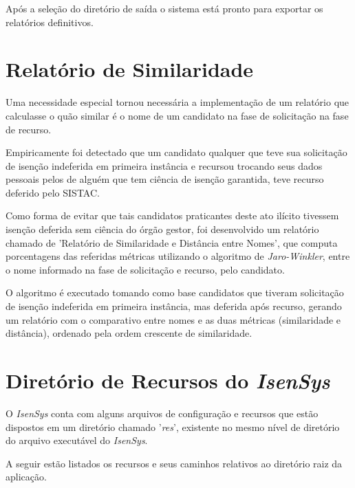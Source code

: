 \documentclass[
	12pt,			%
	openright,		%
	oneside,	
	a4paper,		%
	english,		%
	brazil			%
]{abntex2/abntex2}  %
\begin{document}
					Após a seleção do diretório de saída o sistema está pronto para exportar os relatórios definitivos.

		\section{Relatório de Similaridade}
		
			Uma necessidade especial tornou necessária a implementação de um relatório que calculasse o quão similar é o nome de um candidato na fase de solicitação na fase de recurso.
			
			Empiricamente foi detectado que um candidato qualquer que teve sua solicitação de isenção indeferida em primeira instância e recursou trocando seus dados pessoais pelos de alguém que tem ciência de isenção garantida, teve recurso deferido pelo SISTAC.
			
			Como forma de evitar que tais candidatos praticantes deste ato ilícito tivessem isenção deferida sem ciência do órgão gestor, foi desenvolvido um relatório chamado de 'Relatório de Similaridade e Distância entre Nomes', que computa porcentagens das referidas métricas utilizando o algoritmo de \textit{Jaro-Winkler}, entre o nome informado na fase de solicitação e recurso, pelo candidato.
			
			O algoritmo é executado tomando como base candidatos que tiveram solicitação de isenção indeferida em primeira instância, mas deferida após recurso, gerando um relatório com o comparativo entre nomes e as duas métricas (similaridade e distância), ordenado pela ordem crescente de similaridade.
			

		\section{Diretório de Recursos do \textit{IsenSys}}
		
			O \textit{IsenSys} conta com alguns arquivos de configuração e recursos que estão dispostos em um diretório chamado '\textit{res}', existente no mesmo nível de diretório do arquivo executável do \textit{IsenSys}.
			
			A seguir estão listados os recursos e seus caminhos relativos ao diretório raiz da aplicação.
			
\end{document}

